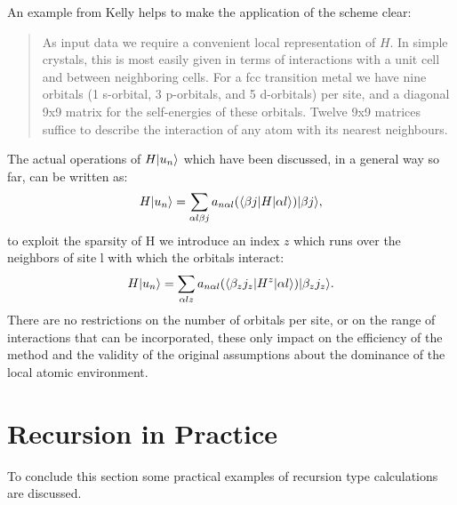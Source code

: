 An example from Kelly helps to make the application of the scheme clear:
%
\begin{quote}
As input data we require a convenient local representation of $H$. In simple crystals,
this is most easily given in terms of interactions with a unit cell and between neighboring cells.
For a fcc transition metal we have nine orbitals (1 s-orbital, 3 p-orbitals, and 5 d-orbitals) per site, 
and a diagonal 9x9 matrix for the self-energies of these orbitals. Twelve 9x9 matrices 
suffice to describe the interaction of any atom with its nearest neighbours.
\end{quote}
%

The actual operations of $H|u_{n}\rangle$ which have been discussed, in a general way so far, 
can be written as:
%
\begin{equation}
H|u_{n}\rangle = \sum_{\alpha l \beta j}a_{n \alpha l}(\langle \beta j |H| \alpha l\rangle)|\beta j\rangle,
\end{equation}
%
to exploit the sparsity of H we introduce an index $z$ which runs over the neighbors of 
site l with which the orbitals interact:
\begin{equation}
H|u_{n}\rangle = \sum_{\alpha l z}a_{n \alpha l}(\langle \beta_{z} j_{z} |H^{z}|\alpha l\rangle)|\beta_{z} j_{z}\rangle.
\end{equation}
There are no restrictions on the number of orbitals per site, or on the range of interactions that can be
incorporated, these only impact on the efficiency of the method and the validity of the original assumptions
about the dominance of the local atomic environment.

\section{Recursion in Practice}
To conclude this section some practical examples of recursion type calculations are discussed.

